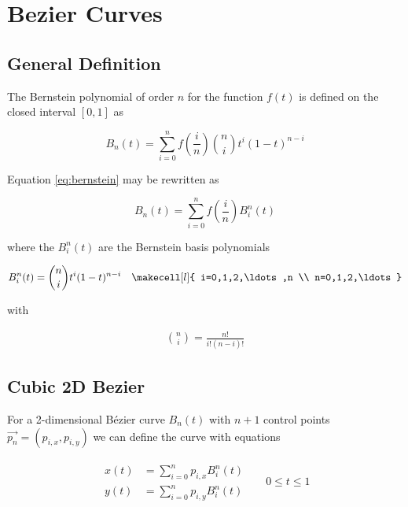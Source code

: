 \section{Bezier Curves}
\label{sec:bezier}

\subsection{General Definition}

The Bernstein polynomial of order $n$ for the function $f(t)$ is defined on the
closed interval $[0,1]$ as

\begin{equation}
    B_n(t) = \sum_{i=0}^n f\left(\frac{i}{n}\right){n\choose i} t^i\left(1-t\right)^{n-i}
    \label{eq:bernstein}
\end{equation}

Equation \ref{eq:bernstein} may be rewritten as

\begin{equation}
    B_n(t) = \sum_{i=0}^n f\left(\frac{i}{n}\right) B_i^n(t)
\end{equation}

where the $B_i^n(t)$ are the Bernstein basis polynomials

\begin{align}
    B_i^n(t) = {n\choose i} t^i (1-t)^{n-i} & & \makecell[l]{ i=0,1,2,\ldots,n \\ n=0,1,2,\ldots }
\end{align}

with

\begin{align}
    {n\choose i} = \frac{n!}{i!(n-i)!}
\end{align}

\subsection{Cubic 2D Bezier}

For  a  2-dimensional   B\'ezier  curve  $B_n(t)$  with  $n+1$  control  points
$\vec{p_n}  =  (p_{i,x},  p_{i,y})$  we  can  define  the  curve with equations

\begin{align}
    \left.\begin{aligned}
        x(t) &= \sum_{i=0}^n p_{i,x} B_i^n(t) \\
        y(t) &= \sum_{i=0}^n p_{i,y} B_i^n(t)
    \end{aligned}\right.
    & & 0 \leq t \leq 1
\end{align}

